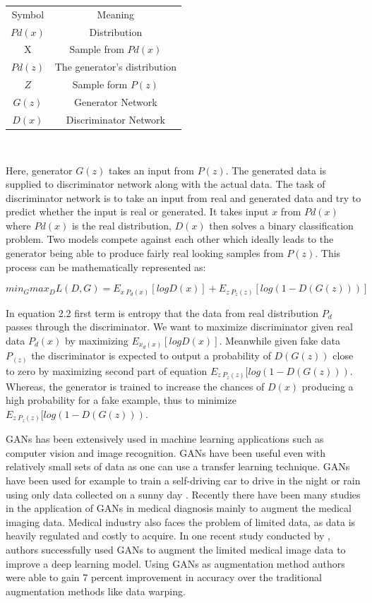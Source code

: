 \begin{center}
	\begin{tabular}{ c c }
		Symbol & Meaning  \\ 
		$Pd(x)$ & Distribution \\ 
		X & Sample from $Pd(x)$  \\  
		$Pd(z)$ & The generator's distribution \\  
		$Z$ & Sample form $P(z)$ \\      
		$G(z)$ & Generator Network \\  
		$D(x)$ & Discriminator Network 
		
	\end{tabular}\\
\end{center}

Here, generator $G(z)$ takes an input from $P(z)$. The generated data is supplied to discriminator network along with the actual data. The task of discriminator network is to take an input from real and generated data and try to predict whether the input is real or generated. It takes input $x$ from $Pd(x)$ where $Pd(x)$ is the real distribution, $D(x)$ then solves a binary classification problem. Two models compete against each other which ideally leads to the generator being able to produce fairly real looking samples from $P(z)$. This process can be mathematically represented as:

\begin{equation}
min_{G}max_{D}L(D,G) = E_{x~P_{d}(x)}[logD(x)]+E_{z~P_{z}(z)}[log(1-D(G(z)))]
\end{equation} 

In equation 2.2 first term is entropy that the data from real distribution $P_d$ passes through the discriminator. We want to maximize discriminator given real data $P_{d}(x)$ by maximizing $E_{x_{d}(x)}[logD(x)]$. Meanwhile given fake data $P_{(z)}$ the discriminator is expected to output a probability of $D(G(z))$ close to zero by maximizing second part of equation $E_{z~P_{z}(z)}[log(1-D(G(z)))$. Whereas, the generator is trained to increase the chances of $D(x)$ producing a high probability for a fake example, thus to minimize $E_{z~P_{z}(z)}[log(1-D(G(z)))$.

GANs has been extensively used in machine learning applications such as computer vision and image recognition. GANs have been useful even with relatively small sets of data as one can use a transfer learning technique. GANs have been used for example to train a self-driving car to drive in the night or rain using only data collected on a sunny day \citep{gurumurthy2017deligan}. Recently there have been many studies in the application of GANs in medical diagnosis mainly to augment the medical imaging data. Medical industry also faces the problem of limited data, as data is heavily regulated and costly to acquire. In one recent study conducted by \citet{frid2018synthetic}, authors successfully used GANs to augment the limited medical image data to improve a deep learning model. Using GANs as augmentation method authors were able to gain 7 percent improvement in accuracy over the traditional augmentation methods like data warping. 

